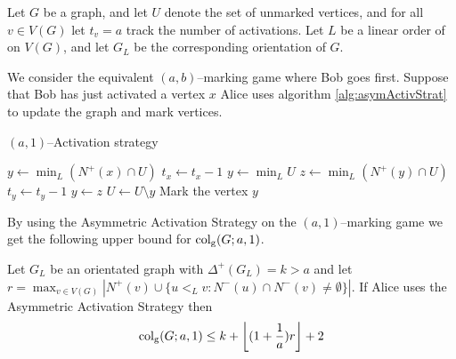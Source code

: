 \begin{definition} 
    Let $G$ be a graph, and let $U$ denote the set of unmarked vertices, and for all $v\in V(G)$ let $t_v=a$ track the number of activations. Let $L$ be a linear order of on $V(G)$, and let $G_L$ be the corresponding orientation of $G$. %
       
    We consider the equivalent $(a,b)$--marking game where Bob goes first. Suppose that Bob has just activated a vertex $x$ Alice uses algorithm \ref{alg:asymActivStrat} to update the graph and mark vertices.
    
    \begin{algorithm}[h]
        \caption{$(a,1)$--Activation strategy}
        \label{alg:asymActivStrat}
        \begin{algorithmic}[1]
            \Statex
                    \State $y\gets \min_L (N^+(x)\cap U)$ %
                    \State $t_x \gets t_x-1$
                    \Else 
                    \State $y\gets \min_L U$                  
                \EndIf
                    \State $z\gets \min_L (N^+(y)\cap U)$ %
                    \State $t_y \gets t_y-1$
                    \State $y\gets z$
                \EndWhile
                \State $U \gets U \setminus y$
                \State Mark the vertex $y$
            \EndFor
        \end{algorithmic}
    \end{algorithm}
    
    By using the Asymmetric Activation Strategy on the $(a,1)$--marking game we get the following upper bound for $\operatorname{col_g}(G;a,1)$.

    \begin{theorem}  %
        Let $G_L$ be an orientated graph with $\Delta^+(G_L)=k>a$ and let $r=\max_{v\in V(G)} |N^+(v)\cup \{u {<_L} v: N^-(u)\cap N^-(v) \neq \emptyset\}|$. If Alice uses the Asymmetric Activation Strategy then \[\operatorname{col_g}(G;a,1)\leq k+\left\lfloor (1+\frac{1}{a})r \right\rfloor +2\]
    \end{theorem}

\end{definition}



